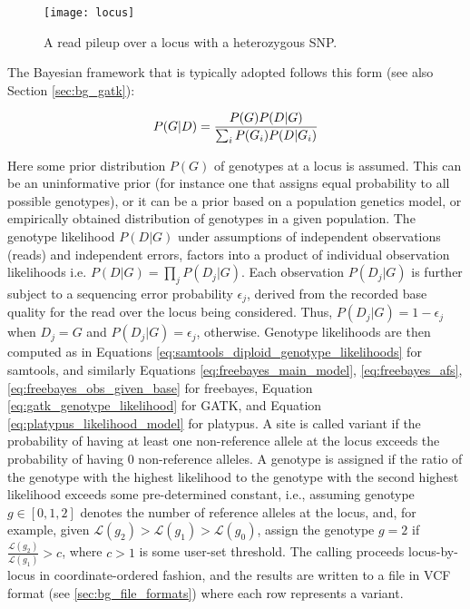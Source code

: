\begin{figure}[H]
    \texttt{[image: locus]}
    \centering
    \caption {A read pileup over a locus with a heterozygous SNP.}
    \label{fig:main_body_locus}
\end{figure}

The Bayesian framework that is typically adopted follows this form (see also Section \ref{sec:bg_gatk}):

\begin{equation}
    \label{eq:main_body_gatk_genotyping}
P(G|D) = {P(G)P(D|G)\over\sum_i P(G_i)P(D|G_i)}
\end{equation}

Here some prior distribution $P(G)$ of genotypes at a locus is assumed. This can be an uninformative prior (for instance one that assigns equal probability to all possible genotypes), or it can be a prior based on a population genetics model, or empirically obtained distribution of genotypes in a given population. The genotype likelihood $P(D|G)$ under assumptions of independent observations (reads) and independent errors, factors into a product of individual observation likelihoods i.e. $P(D|G) = \prod_j{P(D_j|G)}$. Each observation $P(D_j|G)$ is further subject to a sequencing error probability $\epsilon_j$, derived from the recorded base quality for the read over the locus being considered. Thus, $P(D_j|G) = 1 - \epsilon_j$ when $D_j = G$ and $P(D_j|G) = \epsilon_j$, otherwise. Genotype likelihoods are then computed as in Equations \ref{eq:samtools_diploid_genotype_likelihoods} for samtools, and similarly Equations \ref{eq:freebayes_main_model}, \ref{eq:freebayes_afs}, \ref{eq:freebayes_obs_given_base} for freebayes, Equation \ref{eq:gatk_genotype_likelihood} for GATK, and Equation \ref{eq:platypus_likelihood_model} for platypus. A site is called variant if the probability of having at least one non-reference allele at the locus exceeds the probability of having 0 non-reference alleles. A genotype is assigned if the ratio of the genotype with the highest likelihood to the genotype with the second highest likelihood exceeds some pre-determined constant, i.e., assuming genotype $g \in [0,1,2]$ denotes the number of reference alleles at the locus, and, for example, given $\mathcal{L}(g_2) > \mathcal{L}(g_1) > \mathcal{L}(g_0)$, assign the genotype $g=2$ if $\frac{\mathcal{L}(g_2)}{\mathcal{L}(g_1)} > c$, where $c > 1$ is some user-set threshold. The calling proceeds locus-by-locus in coordinate-ordered fashion, and the results are written to a file in VCF format (see \ref{sec:bg_file_formats}) where each row represents a variant.

